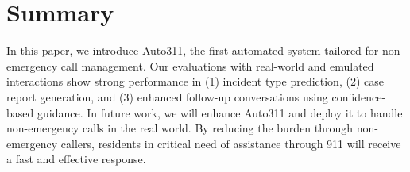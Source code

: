 \section{Summary}

In this paper, we introduce Auto311, the first automated system tailored for non-emergency call management. Our evaluations with real-world and emulated interactions show strong performance in (1) incident type prediction, (2) case report generation, and (3) enhanced follow-up conversations using confidence-based guidance. 
In future work, we will enhance Auto311 and deploy it to handle non-emergency calls in the real world.
By reducing the 
burden through non-emergency callers, residents in critical need of assistance through 911 will receive a fast and effective response. 



